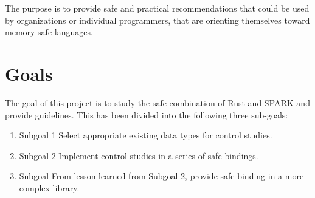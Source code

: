 \documentclass[nomenclature, english, bibtex]{kththesis}
\newcommand*{\generalExpl}[1]{\todo[inline]{#1}}
\newcommand*{\sweExpl}[1]{\todo[inline, backgroundcolor=kth-lightblue40]{#1}}  %
\begin{document}
The purpose is to provide safe and practical recommendations that could be used by organizations or individual programmers, that are orienting themselves toward memory-safe languages.

\section{Goals}


The goal of this project is to study the safe combination of Rust and SPARK and provide guidelines. This has been divided into the following three sub-goals:

\begin{enumerate}
\item Subgoal 1 Select appropriate existing data types for control studies.
\item Subgoal 2 Implement control studies in a series of safe bindings.
\item Subgoal From lesson learned from Subgoal 2, provide safe binding in a more complex library.
\end{enumerate}

\end{document}
